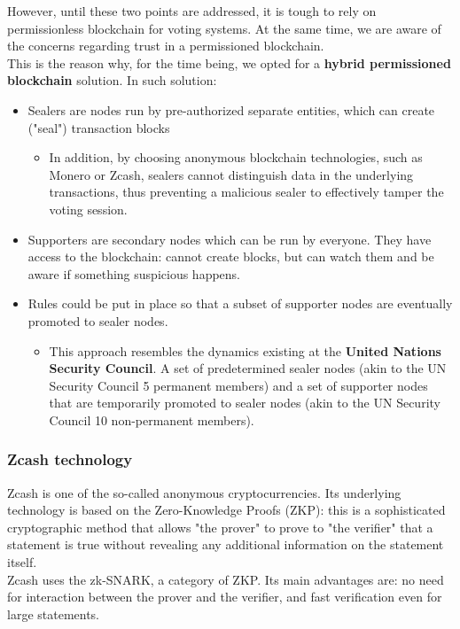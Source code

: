 \documentclass[10pt, letterpaper]{article}
\begin{document}
However, until these two points are addressed, it is tough to rely on permissionless blockchain for voting systems. At the same time, we are aware of the concerns regarding trust in a permissioned blockchain.\\
This is the reason why, for the time being, we opted for a \textbf{hybrid permissioned blockchain} solution. In such solution:
\begin{itemize}
\item Sealers are nodes run by pre-authorized separate entities, which can create ("seal") transaction blocks 
\begin{itemize}
\item In addition, by choosing anonymous blockchain technologies, such as Monero or Zcash, sealers cannot distinguish data in the underlying transactions, thus preventing a malicious sealer to effectively tamper the voting session.
\end{itemize}
\item Supporters are secondary nodes which can be run by everyone. They have access to the blockchain: cannot create blocks, but can watch them and be aware if something suspicious happens.
\item Rules could be put in place so that a subset of supporter nodes are eventually promoted to sealer nodes.
\begin{itemize}
\item This approach resembles the dynamics existing at the \textbf{United Nations Security Council}. A set of predetermined sealer nodes (akin to the UN Security Council 5 permanent members) and a set of supporter nodes that are temporarily promoted to sealer nodes (akin to the UN Security Council 10 non-permanent members).
\end{itemize}
\end{itemize}
\subsubsection{Zcash technology}
Zcash is one of the so-called anonymous cryptocurrencies. Its underlying technology is based on the Zero-Knowledge Proofs (ZKP): this is a sophisticated cryptographic method that allows "the prover" to prove to "the verifier" that a statement is true without revealing any additional information on the statement itself.\\
Zcash uses the zk-SNARK, a category of ZKP. Its main advantages are: no need for interaction between the prover and the verifier, and fast verification even for large statements.
\bigskip
\end{document}
